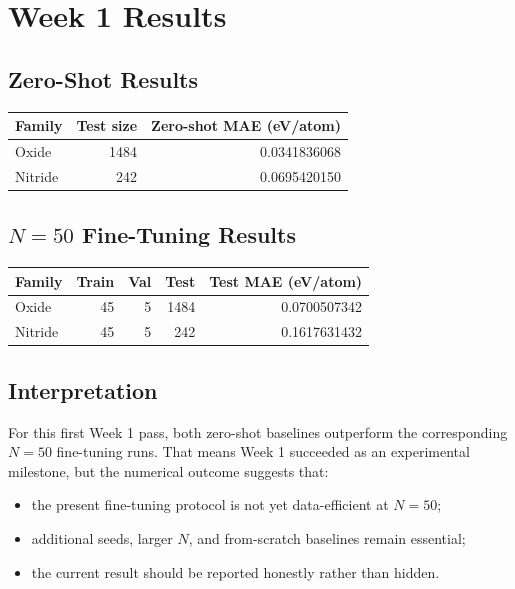 \documentclass[11pt]{article}
\begin{document}
\section{Week 1 Results}

\subsection{Zero-Shot Results}
\begin{center}
\begin{tabular}{lrr}
\toprule
Family & Test size & Zero-shot MAE (eV/atom) \\
\midrule
Oxide   & 1484 & 0.0341836068 \\
Nitride &  242 & 0.0695420150 \\
\bottomrule
\end{tabular}
\end{center}

\subsection{$N=50$ Fine-Tuning Results}
\begin{center}
\begin{tabular}{lrrrr}
\toprule
Family & Train & Val & Test & Test MAE (eV/atom) \\
\midrule
Oxide   & 45 & 5 & 1484 & 0.0700507342 \\
Nitride & 45 & 5 &  242 & 0.1617631432 \\
\bottomrule
\end{tabular}
\end{center}

\subsection{Interpretation}
For this first Week 1 pass, both zero-shot baselines outperform the corresponding $N=50$ fine-tuning runs.
That means Week 1 succeeded as an experimental milestone, but the numerical outcome suggests that:
\begin{itemize}
  \item the present fine-tuning protocol is not yet data-efficient at $N=50$;
  \item additional seeds, larger $N$, and from-scratch baselines remain essential;
  \item the current result should be reported honestly rather than hidden.
\end{itemize}
\end{document}
